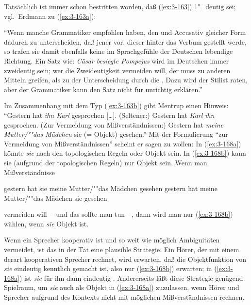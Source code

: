 \documentclass[output=paper]{langsci/langscibook}
\begin{document}
Tatsächlich ist immer schon bestritten worden, daß (\ref{ex:3-163}) 1"=deutig sei;
vgl.\ Erdmann zu (\ref{ex:3-163a}):
\begin{exe}
\ex \label{ex:3-166}
"`Wenn manche Grammatiker empfohlen haben, den  und Accusativ gleicher Form dadurch zu unterscheiden, daß jener vor, dieser hinter das Verbum gestellt werde, so trafen sie damit ebenfalls keine im Sprachgefühle der Deutschen lebendige Richtung. Ein Satz wie: \textit{Cäsar besiegte Pompejus} wird im Deutschen immer zweideutig sein; wer die Zweideutigkeit vermeiden will, der muss zu anderen Mitteln greifen, als zu der Unterscheidung durch die . Dazu wird der Stilist raten, aber der Grammatiker kann den Satz nicht für unrichtig erklären."' \citep[183]{Erdmann1886}
\end{exe}
Im Zusammenhang mit dem Typ (\ref{ex:3-163b}) gibt Mentrup einen Hinweis:
\ea
\label{ex:3-167}
	"`Gestern hat \textit{ihn Karl} gesprochen [\ldots]. (Seltener:) Gestern hat
\textit{Karl ihn} gesprochen. (Zur Vermeidung von Mißverständnissen:) Gestern
hat \textit{meine Mutter/""das Mädchen} sie (= Objekt) gesehen."'
\citep[§\,1524]{Duden73}
\z
Mit der Formulierung "`zur Vermeidung von Mißverständnissen"' scheint er
sagen zu wollen: In (\ref{ex:3-168a}) könnte \textit{sie} nach den topologischen Regeln
 oder Objekt sein. In (\ref{ex:3-168b}) kann sie (aufgrund der
topologischen Regeln) nur Objekt sein. Wenn man Mißverständnisse
\begin{exe}
\ex
\label{ex:3-168}
\begin{xlist}
\ex
\label{ex:3-168a}
gestern hat sie meine Mutter/""das Mädchen gesehen
\ex
\label{ex:3-168b}
gestern hat meine Mutter/""das Mädchen sie gesehen
\end{xlist}
\end{exe}
vermeiden will~-- und das sollte man tun~--, dann wird man nur (\ref{ex:3-168b}) wählen, wenn \textit{sie} Objekt ist.

Wenn ein Sprecher kooperativ ist und so weit wie möglich Ambiguitäten
vermeidet, ist das in der Tat eine plausible Strategie. Ein Hörer, der
mit einem derart kooperativen Sprecher rechnet, wird erwarten, daß die
Objektfunktion von \textit{sie} eindeutig kenntlich gemacht ist, also
nur (\ref{ex:3-168b}) erwarten; in (\ref{ex:3-168a}) ist \textit{sie} für ihn dann
eindeutig . Andererseits läßt diese Strategie genügend
Spielraum, um \textit{sie} auch als Objekt in (\ref{ex:3-168a}) zuzulassen, wenn Hörer
und Sprecher aufgrund des Kontexts nicht mit möglichen
Mißverständnissen rechnen.
\end{document}
